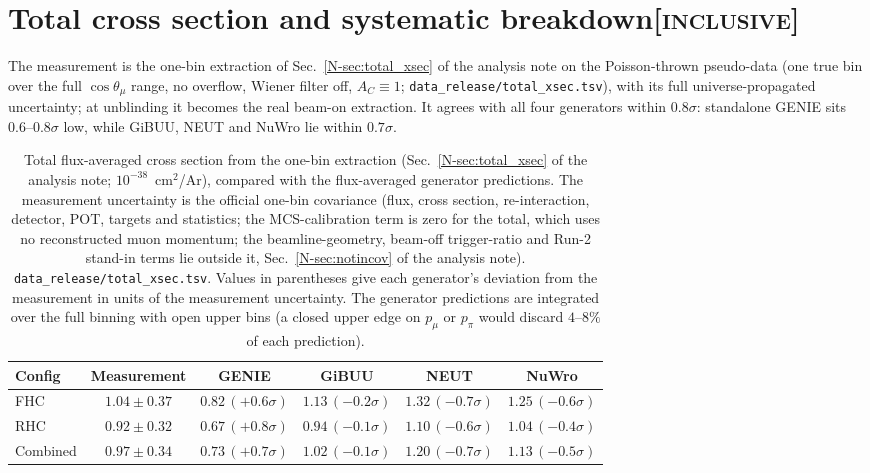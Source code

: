 \documentclass[11pt,a4paper]{article}
\newcommand{\noteref}[2]{#1~\ref{N-#2} of the analysis note}
\newcommand{\scopetag}[1]{\hfill{\normalfont\small\textsc{[#1]}}}
\begin{document}
\section[Total cross section and systematic breakdown]{Total cross section and systematic breakdown\scopetag{inclusive}}
\label{sec:supp_total}

The measurement is the one-bin extraction of \noteref{Sec.}{sec:total_xsec} on the
Poisson-thrown pseudo-data (one true bin over the full $\cos\theta_\mu$ range, no overflow,
Wiener filter off, $A_C\equiv1$; \texttt{data\_release/total\_xsec.tsv}), with its full
universe-propagated uncertainty; at unblinding it becomes the real beam-on extraction.
It agrees with all four generators within $0.8\sigma$: standalone GENIE sits
$0.6$--$0.8\sigma$ low, while GiBUU, NEUT and NuWro lie within $0.7\sigma$.

\begin{table}[H]
  \centering
  \caption{Total flux-averaged cross section from the one-bin extraction
    (\noteref{Sec.}{sec:total_xsec}; $10^{-38}$~cm$^2$/Ar), compared with the flux-averaged
    generator predictions. The measurement uncertainty is the official one-bin
    covariance (flux, cross section, re-interaction, detector, POT, targets and statistics; the MCS-calibration
    term is zero for the total, which uses no reconstructed muon momentum; the
    beamline-geometry, beam-off trigger-ratio and Run-2 stand-in terms lie outside it,
    \noteref{Sec.}{sec:notincov}). \texttt{data\_release/total\_xsec.tsv}. Values in
    parentheses give each generator's deviation from the measurement in units of the
    measurement uncertainty. The generator predictions are integrated over the full binning with open upper bins
    (a closed upper edge on $p_\mu$ or $p_\pi$ would discard $4$--$8\%$ of each prediction).}
  \label{tab:total_xsec}
  \begin{tabular}{lccccc}
\toprule
Config & Measurement & GENIE & GiBUU & NEUT & NuWro \\
\midrule
    FHC      & $1.04 \pm 0.37$ & $0.82\,(+0.6\sigma)$ & $1.13\,(-0.2\sigma)$ & $1.32\,(-0.7\sigma)$ & $1.25\,(-0.6\sigma)$ \\
    RHC      & $0.92 \pm 0.32$ & $0.67\,(+0.8\sigma)$ & $0.94\,(-0.1\sigma)$ & $1.10\,(-0.6\sigma)$ & $1.04\,(-0.4\sigma)$ \\
    Combined & $0.97 \pm 0.34$ & $0.73\,(+0.7\sigma)$ & $1.02\,(-0.1\sigma)$ & $1.20\,(-0.7\sigma)$ & $1.13\,(-0.5\sigma)$ \\
\bottomrule
\end{tabular}
\end{table}
\end{document}
